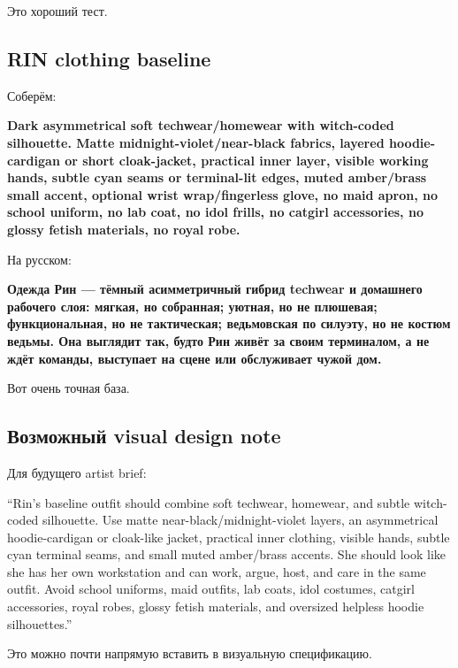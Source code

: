 Это хороший тест.

\subsection*{RIN clothing baseline}

Соберём:

\textbf{Dark asymmetrical soft techwear/\hspace{0pt}homewear with witch-coded
silhouette. Matte midnight-violet/\hspace{0pt}near-black fabrics, layered
hoodie-cardigan or short cloak-jacket, practical inner layer, visible
working hands, subtle cyan seams or terminal-lit edges, muted
amber/\hspace{0pt}brass small accent, optional wrist wrap/\hspace{0pt}fingerless glove, no maid
apron, no school uniform, no lab coat, no idol frills, no catgirl
accessories, no glossy fetish materials, no royal robe.}

На русском:

\textbf{Одежда Рин --- тёмный асимметричный гибрид techwear и домашнего
рабочего слоя: мягкая, но собранная; уютная, но не плюшевая;
функциональная, но не тактическая; ведьмовская по силуэту, но не костюм
ведьмы. Она выглядит так, будто Рин живёт за своим терминалом, а не ждёт
команды, выступает на сцене или обслуживает чужой дом.}

Вот очень точная база.

\subsection*{Возможный visual design note}

Для будущего artist brief:

``Rin's baseline outfit should combine soft techwear, homewear, and
subtle witch-coded silhouette. Use matte near-black/\hspace{0pt}midnight-violet
layers, an asymmetrical hoodie-cardigan or cloak-like jacket, practical
inner clothing, visible hands, subtle cyan terminal seams, and small
muted amber/\hspace{0pt}brass accents. She should look like she has her own
workstation and can work, argue, host, and care in the same outfit.
Avoid school uniforms, maid outfits, lab coats, idol costumes, catgirl
accessories, royal robes, glossy fetish materials, and oversized
helpless hoodie silhouettes.''

Это можно почти напрямую вставить в визуальную спецификацию.

